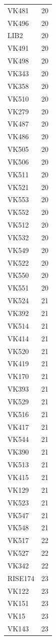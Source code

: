 \begin{longtable}[t]{ll}
VK481 & 20\\
VK496 & 20\\
LIB2 & 20\\
VK491 & 20\\
VK498 & 20\\
VK343 & 20\\
VK358 & 20\\
VK510 & 20\\
VK279 & 20\\
VK487 & 20\\
VK486 & 20\\
VK505 & 20\\
VK506 & 20\\
VK511 & 20\\
VK521 & 20\\
VK553 & 20\\
VK552 & 20\\
VK512 & 20\\
VK532 & 20\\
VK549 & 20\\
VK522 & 20\\
VK550 & 20\\
VK551 & 20\\
VK524 & 21\\
VK392 & 21\\
VK514 & 21\\
VK414 & 21\\
VK520 & 21\\
VK419 & 21\\
VK170 & 21\\
VK393 & 21\\
VK529 & 21\\
VK516 & 21\\
VK417 & 21\\
VK544 & 21\\
VK390 & 21\\
VK513 & 21\\
VK415 & 21\\
VK129 & 21\\
VK523 & 21\\
VK547 & 21\\
VK548 & 21\\
VK517 & 22\\
VK527 & 22\\
VK342 & 22\\
RISE174 & 23\\
VK122 & 23\\
VK151 & 23\\
VK15 & 23\\
VK143 & 23\\

\end{longtable}
